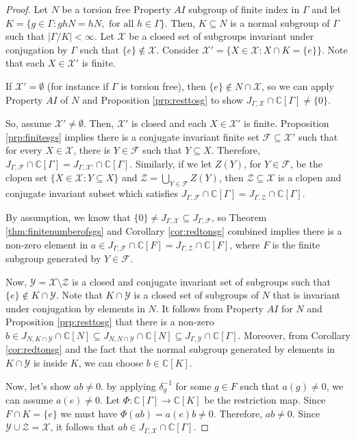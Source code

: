 \documentclass[a4paper, 12pt]{amsart}
\theoremstyle{definition}
\theoremstyle{remark}
\numberwithin{equation}{section}
\begin{document}
\begin{proof}
    Let $N$ be a torsion free Property $AI$ subgroup of finite index in $\Gamma$ and let $K = \{g\in \Gamma: ghN = hN,\text{ for all }h\in \Gamma\}$. Then, $K\subseteq N$ is a normal subgroup of $\Gamma$ such that $|\Gamma/K| <\infty$. Let $\mathcal{X}$ be a closed set of subgroups invariant under conjugation by $\Gamma$ such that $\{e\}\notin\mathcal{X}$. Consider $\mathcal{X}' = \{X\in\mathcal{X}: X\cap K = \{e\}\}$. Note that each $X\in\mathcal{X}'$ is finite.

    If $\mathcal{X}' = \emptyset$ (for instance if $\Gamma$ is torsion free), then $\{e\}\notin N\cap\mathcal{X}$, so we can apply Property $AI$ of $N$ and Proposition \ref{prp:resttosg} to show $J_{\Gamma,\mathcal{X}}\cap\mathbb{C}[\Gamma]\neq \{0\}$.
    
    
    So, assume $\mathcal{X}'\neq \emptyset$. Then, $\mathcal{X}'$ is closed and each $X\in \mathcal{X}'$ is finite. Proposition \ref{prp:finitesgs} implies there is a conjugate invariant finite set $\mathcal{F}\subseteq \mathcal{X}'$ such that for every $X\in\mathcal{X}$, there is $Y\in\mathcal{F}$ such that $Y\subseteq X$. Therefore, $J_{\Gamma, \mathcal{F}}\cap\mathbb{C}[\Gamma] = J_{\Gamma,\mathcal{X}'}\cap\mathbb{C}[\Gamma]$. Similarly, if we let $Z(Y)$, for $Y\in \mathcal{F}$, be the clopen set  $\{X\in\mathcal{X}: Y\subseteq X\}$ and $\mathcal{Z} = \bigcup_{Y\in\mathcal{F}}Z(Y)$, then $\mathcal{Z}\subseteq \mathcal{X}$ is a clopen and conjugate invariant subset which satisfies $J_{\Gamma, \mathcal{F}}\cap\mathbb{C}[\Gamma] = J_{\Gamma, \mathcal{Z}}\cap\mathbb{C}[\Gamma]$.
    
    By assumption, we know that $\{0\}\neq J_{\Gamma,\mathcal{X}}\subseteq J_{\Gamma, \mathcal{F}}$, so Theorem \ref{thm:finitenumberofsgs} and Corollary \ref{cor:redtonsg} combined implies there is a non-zero element in $a\in J_{\Gamma, \mathcal{F}}\cap\mathbb{C}[F] = J_{\Gamma, \mathcal{Z}}\cap\mathbb{C}[F]$, where $F$ is the finite subgroup generated by $Y\in\mathcal{F}$.

    Now, $\mathcal{Y} = \mathcal{X}\setminus \mathcal{Z}$ is a closed and conjugate invariant set of subgroups such that $\{e\}\notin K\cap \mathcal{Y}$. Note that $K\cap \mathcal{Y}$ is a closed set of subgroups of $N$ that is invariant under conjugation by elements in $N$. It follows from Property $AI$ for $N$ and Proposition \ref{prp:resttosg} that there is a non-zero $b\in J_{N, K\cap \mathcal{Y}}\cap\mathbb{C}[N]\subseteq J_{N, N\cap \mathcal{Y}}\cap\mathbb{C}[N]\subseteq J_{\Gamma, \mathcal{Y}}\cap\mathbb{C}[\Gamma]$. Moreover, from Corollary \ref{cor:redtonsg} and the fact that the normal subgroup generated by elements in $K\cap\mathcal{Y}$ is inside $K$, we can choose $b\in \mathbb{C}[K]$.

    Now, let's show $ab\neq 0$. by applying $\delta^{-1}_{g}$ for some $g\in F$ such that $a(g)\neq 0$, we can assume $a(e)\neq 0$. Let $\Phi:\mathbb{C}[\Gamma]\to \mathbb{C}[K]$ be the restriction map. Since $F\cap K = \{e\}$ we must have $\Phi(ab) = a(e)b\neq 0$. Therefore, $ab\neq 0$. Since $\mathcal{Y}\cup \mathcal{Z} = \mathcal{X}$, it follows that $ab\in J_{\Gamma,\mathcal{X}}\cap\mathbb{C}[\Gamma]$.
\end{proof}
\end{document}
